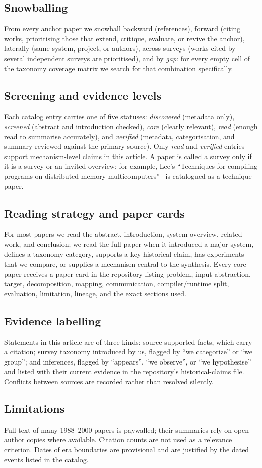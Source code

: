 \subsection{Snowballing}
From every anchor paper we snowball backward (references), forward (citing works, prioritising those that extend, critique, evaluate, or revive the anchor), laterally (same system, project, or authors), across surveys (works cited by several independent surveys are prioritised), and by \emph{gap}: for every empty cell of the taxonomy coverage matrix we search for that combination specifically.

\subsection{Screening and evidence levels}
Each catalog entry carries one of five statuses: \emph{discovered} (metadata only), \emph{screened} (abstract and introduction checked), \emph{core} (clearly relevant), \emph{read} (enough read to summarise accurately), and \emph{verified} (metadata, categorisation, and summary reviewed against the primary source). Only \emph{read} and \emph{verified} entries support mechanism-level claims in this article. A paper is called a survey only if it is a survey or an invited overview; for example, Lee's ``Techniques for compiling programs on distributed memory multicomputers''~\cite{lee1995techniques} is catalogued as a technique paper.

\subsection{Reading strategy and paper cards}
For most papers we read the abstract, introduction, system overview, related work, and conclusion; we read the full paper when it introduced a major system, defines a taxonomy category, supports a key historical claim, has experiments that we compare, or supplies a mechanism central to the synthesis. Every core paper receives a paper card in the repository listing problem, input abstraction, target, decomposition, mapping, communication, compiler/runtime split, evaluation, limitation, lineage, and the exact sections used.

\subsection{Evidence labelling}
Statements in this article are of three kinds: source-supported facts, which carry a citation; survey taxonomy introduced by us, flagged by ``we categorize'' or ``we group''; and inferences, flagged by ``appears'', ``we observe'', or ``we hypothesise'' and listed with their current evidence in the repository's historical-claims file. Conflicts between sources are recorded rather than resolved silently.

\subsection{Limitations}
Full text of many 1988--2000 papers is paywalled; their summaries rely on open author copies where available. Citation counts are not used as a relevance criterion. Dates of era boundaries are provisional and are justified by the dated events listed in the catalog.
